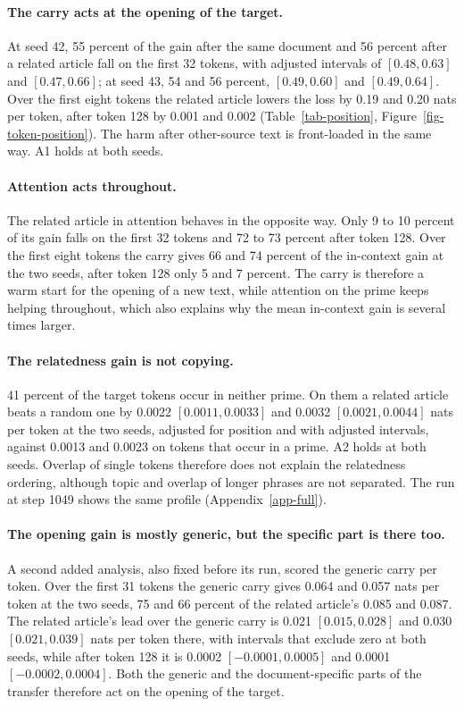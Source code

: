 \documentclass[12pt,a4paper]{report}
\begin{document}
\paragraph{The carry acts at the opening of the target.} At seed 42, 55 percent of the gain after the same document and 56 percent after a related article fall on the first 32 tokens, with adjusted intervals of $[0.48, 0.63]$ and $[0.47, 0.66]$; at seed 43, 54 and 56 percent, $[0.49, 0.60]$ and $[0.49, 0.64]$. Over the first eight tokens the related article lowers the loss by 0.19 and 0.20 nats per token, after token 128 by 0.001 and 0.002 (Table~\ref{tab-position}, Figure~\ref{fig-token-position}). The harm after other-source text is front-loaded in the same way. A1 holds at both seeds.

\paragraph{Attention acts throughout.} The related article in attention behaves in the opposite way. Only 9 to 10 percent of its gain falls on the first 32 tokens and 72 to 73 percent after token 128. Over the first eight tokens the carry gives 66 and 74 percent of the in-context gain at the two seeds, after token 128 only 5 and 7 percent. The carry is therefore a warm start for the opening of a new text, while attention on the prime keeps helping throughout, which also explains why the mean in-context gain is several times larger.

\paragraph{The relatedness gain is not copying.} 41 percent of the target tokens occur in neither prime. On them a related article beats a random one by 0.0022 $[0.0011, 0.0033]$ and 0.0032 $[0.0021, 0.0044]$ nats per token at the two seeds, adjusted for position and with adjusted intervals, against 0.0013 and 0.0023 on tokens that occur in a prime. A2 holds at both seeds. Overlap of single tokens therefore does not explain the relatedness ordering, although topic and overlap of longer phrases are not separated. The run at step 1049 shows the same profile (Appendix~\ref{app-full}).

\paragraph{The opening gain is mostly generic, but the specific part is there too.} A second added analysis, also fixed before its run, scored the generic carry per token. Over the first 31 tokens the generic carry gives 0.064 and 0.057 nats per token at the two seeds, 75 and 66 percent of the related article's 0.085 and 0.087. The related article's lead over the generic carry is 0.021 $[0.015, 0.028]$ and 0.030 $[0.021, 0.039]$ nats per token there, with intervals that exclude zero at both seeds, while after token 128 it is 0.0002 $[-0.0001, 0.0005]$ and 0.0001 $[-0.0002, 0.0004]$. Both the generic and the document-specific parts of the transfer therefore act on the opening of the target.
\end{document}
